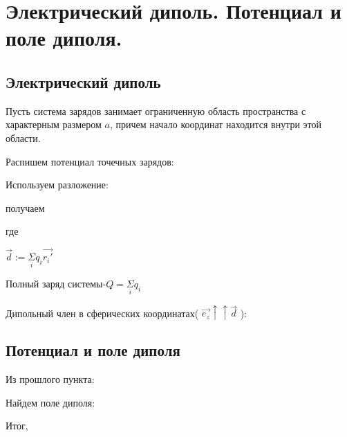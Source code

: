 \section{Электрический диполь. Потенциал и поле диполя.}

\subsection*{Электрический диполь}

Пусть система зарядов занимает ограниченную область пространства с характерным размером $a$, причем начало координат находится внутри этой области.


Распишем потенциал точечных зарядов:



Используем разложение:


получаем


где

 $\boxed{\vec{d}:=\underset{i}{\Sigma}q_i\vec{r_i'}}$

Полный заряд системы-$Q=\underset{i}{\Sigma}q_i$

Дипольный член в сферических координатах( $\vec{e_z}\uparrow\uparrow\vec{d}$ ):


\subsection*{Потенциал и поле диполя}

Из прошлого пункта:


Найдем поле диполя:



Итог, 

